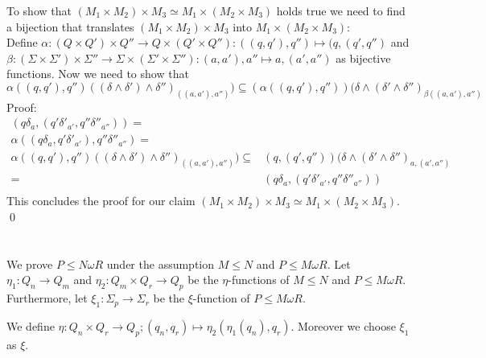 \documentclass[a4paper,12pt,numbers=noenddot]{scrreport}
\begin{document}
To show that $(M_1 \times M_2) \times M_3 \simeq M_1 \times (M_2 \times M_3)$ holds true we need to find a bijection that translates $(M_1 \times M_2) \times M_3$ into $M_1 \times (M_2 \times M_3)$:\\
Define $\alpha: (Q\times Q') \times Q'' \rightarrow Q \times (Q' \times Q'') : ((q, q'), q'') \mapsto (q, (q', q'')$ and $\beta : (\Sigma \times \Sigma') \times \Sigma'' \rightarrow \Sigma \times (\Sigma' \times \Sigma'') : (a, a'), a'' \mapsto a, (a', a'')$ as bijective functions.
Now we need to show that 
\begin{equation}
    \alpha((q,q'),q'')((\delta \land \delta') \land \delta'')_{((a, a'), a'')}) \subseteq (\alpha((q,q'),q''))(\delta \land (\delta' \land \delta'')_{\beta((a, a'), a'')}
\end{equation}
Proof:\\
\begin{align*}
    (q\delta_a, (q'\delta'_{a'} , q''\delta''_{a''})) = &\\
    \alpha((q\delta_a, q'\delta'_{a'}), q''\delta''_{a''} ) = & \\
    \alpha((q,q'),q'')((\delta \land \delta') \land \delta'')_{((a, a'), a'')}) \subseteq & (q, (q', q''))(\delta \land (\delta' \land \delta'')_{a, (a', a'')}\\
                    = & (q\delta_a, (q'\delta'_{a'} , q''\delta''_{a''}))\\
\end{align*}
This concludes the proof for our claim $(M_1 \times M_2) \times M_3 \simeq M_1 \times (M_2 \times M_3)$.
\qed
\section{}
We prove $P \leq N \omega R$ under the assumption $M \leq N$ and $P \leq M \omega R$.
Let $\eta_1: Q_n \rightarrow Q_m$ and $\eta_2: Q_m \times Q_r \rightarrow Q_p$ be the $\eta$-functions of $M \leq N$ and $P \leq M \omega R$.
Furthermore, let $\xi_1: \Sigma_p \rightarrow \Sigma_r$ be the $\xi$-function of $P \leq M \omega R$.

We define $\eta : Q_n \times Q_r \rightarrow Q_p; (q_n, q_r) \mapsto \eta_2(\eta_1(q_n), q_r)$.
Moreover we choose $\xi_1$ as $\xi$.
\end{document}
